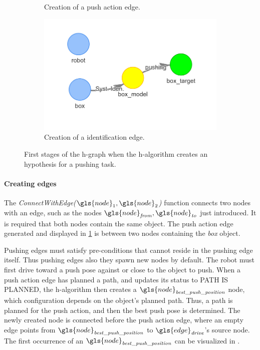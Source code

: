 \begin{figure}[h]
\begin{subfigure}{.32\textwidth}
    \caption{Creation of a push action edge.}\label{subfig:robot_push_2}
    \end{subfigure}
    \begin{subfigure}{.35\textwidth}
    \includegraphics[width=1.2\textwidth]{figures/proposed_method/connecting_nodes/robot_push/robot_push_2}
    \caption{Creation of a identification edge.}\label{subfig:robot_push_3}
    \end{subfigure}
    \caption{First stages of the \ac{h-graph} when the \ac{h-algorithm} creates an hypothesis for a pushing task.}%
    \label{fig:robot_push_1}
\end{figure}

\paragraph{Creating edges}
The \textit{ConnectWithEdge($\gls{node}_1, \gls{node}_2$)} function connects two nodes with an edge, such as the nodes $\gls{node}_\mathit{from}, \gls{node}_\mathit{to}$ just introduced. It is required that both nodes contain the same object. The push action edge generated and displayed in \cref{subfig:robot_push_2} is between two nodes containing the \textit{box} object.\bs

Pushing edges must satisfy pre-conditions that cannot reside in the pushing edge itself. Thus pushing edges also they spawn new nodes by default. The robot must first drive toward a push pose against or close to the object to push. When a push action edge has planned a path, and updates its status to PATH IS PLANNED, the \ac{h-algorithm} then creates a $\gls{node}_\mathit{best\_push\_position}$ node, which configuration depends on the object's planned path. Thus, a path is planned for the push action, and then the best push pose is determined. The newly created node is connected before the push action edge, where an empty edge points from $\gls{node}_\mathit{best\_push\_position}$ to $\gls{edge}_\mathit{drive}$'s source node. The first occurrence of an $\gls{node}_\mathit{best\_push\_position}$ can be visualized in .\bs

